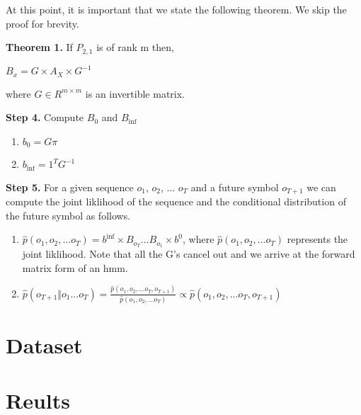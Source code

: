 \documentclass{article} %
\begin{document}
At this point, it is important that we state the following theorem. We skip the proof for brevity.

\textbf{Theorem 1.} If $P_{2,1}$ is of rank m then,
\begin{center}
$B_x = G \times A_X \times G^{-1}$
\end{center}
where $G \in R^{m \times m}$ is an invertible matrix.

\textbf{Step 4.} Compute $B_{0}$ and $B_{\inf}$
\begin{enumerate}
\item $b_{0} = G\pi$ 
\item $b_{\inf} = 1^TG^{-1}$
\end{enumerate}

\textbf{Step 5.} For a given sequence $o_1$, $o_2$, ... $o_T$ and a future symbol $o_{T+1}$ we can compute the joint liklihood of the sequence and the conditional distribution of the future symbol as follows.
\begin{enumerate}
\item $\hat{p}(o_1, o_2, ... o_T) = b^{\inf} \times B_{o_{T}} . . . B_{o_{1}} \times b^{0}$, 
\newline where $\hat{p}(o_1, o_2, ... o_T)$ represents the joint liklihood. Note that all the G's cancel out and we arrive at the forward matrix form of an hmm.

\item $\hat{p}(o_{T+1} \Vert o_{1}...o_{T} ) = \frac{\hat{p}(o_1, o_2, ... o_T, o_{T+1})}{\hat{p}(o_1, o_2, ... o_T)} \propto \hat{p}(o_1, o_2, ... o_T, o_{T+1})$ 

\end{enumerate}

\section{Dataset}
\section{Reults}
\end{document}
